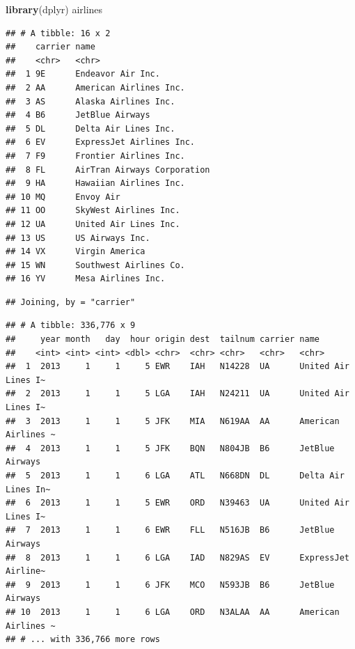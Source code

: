 \documentclass[]{book}
\newenvironment{Shaded}{\begin{snugshade}}{\end{snugshade}}
\newcommand{\KeywordTok}[1]{\textcolor[rgb]{0.13,0.29,0.53}{\textbf{#1}}}
\newcommand{\StringTok}[1]{\textcolor[rgb]{0.31,0.60,0.02}{#1}}
\newcommand{\CommentTok}[1]{\textcolor[rgb]{0.56,0.35,0.01}{\textit{#1}}}
\newcommand{\OperatorTok}[1]{\textcolor[rgb]{0.81,0.36,0.00}{\textbf{#1}}}
\newcommand{\NormalTok}[1]{#1}
\theoremstyle{definition}
\theoremstyle{definition}
\theoremstyle{definition}
\theoremstyle{remark}
\begin{document}
\begin{Shaded}
\begin{Highlighting}[]
\KeywordTok{library}\NormalTok{(dplyr) }
\NormalTok{airlines  }
\end{Highlighting}
\end{Shaded}

\begin{verbatim}
## # A tibble: 16 x 2
##    carrier name                       
##    <chr>   <chr>                      
##  1 9E      Endeavor Air Inc.          
##  2 AA      American Airlines Inc.     
##  3 AS      Alaska Airlines Inc.       
##  4 B6      JetBlue Airways            
##  5 DL      Delta Air Lines Inc.       
##  6 EV      ExpressJet Airlines Inc.   
##  7 F9      Frontier Airlines Inc.     
##  8 FL      AirTran Airways Corporation
##  9 HA      Hawaiian Airlines Inc.     
## 10 MQ      Envoy Air                  
## 11 OO      SkyWest Airlines Inc.      
## 12 UA      United Air Lines Inc.      
## 13 US      US Airways Inc.            
## 14 VX      Virgin America             
## 15 WN      Southwest Airlines Co.     
## 16 YV      Mesa Airlines Inc.
\end{verbatim}

\begin{Shaded}
\end{Shaded}

\begin{verbatim}
## Joining, by = "carrier"
\end{verbatim}

\begin{verbatim}
## # A tibble: 336,776 x 9
##     year month   day  hour origin dest  tailnum carrier name               
##    <int> <int> <int> <dbl> <chr>  <chr> <chr>   <chr>   <chr>              
##  1  2013     1     1     5 EWR    IAH   N14228  UA      United Air Lines I~
##  2  2013     1     1     5 LGA    IAH   N24211  UA      United Air Lines I~
##  3  2013     1     1     5 JFK    MIA   N619AA  AA      American Airlines ~
##  4  2013     1     1     5 JFK    BQN   N804JB  B6      JetBlue Airways    
##  5  2013     1     1     6 LGA    ATL   N668DN  DL      Delta Air Lines In~
##  6  2013     1     1     5 EWR    ORD   N39463  UA      United Air Lines I~
##  7  2013     1     1     6 EWR    FLL   N516JB  B6      JetBlue Airways    
##  8  2013     1     1     6 LGA    IAD   N829AS  EV      ExpressJet Airline~
##  9  2013     1     1     6 JFK    MCO   N593JB  B6      JetBlue Airways    
## 10  2013     1     1     6 LGA    ORD   N3ALAA  AA      American Airlines ~
## # ... with 336,766 more rows
\end{verbatim}
\end{document}
